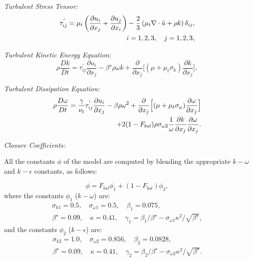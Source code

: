 {\it Turbulent Stress Tensor:}
\begin{equation}
\begin{split}
\tau_{ij}^{'}=\mu_t \left(\frac{\partial u_i}{\partial x_j}+\frac
{\partial u_j}{\partial x_i}\right) - \frac{2}{3} \left(\mu_t \nabla \cdot \Tilde{u} + \rho k\right) \delta_{ij}, \\
 i=1,2,3, \quad j=1,2,3,
\end{split}
\end{equation}


{\it Turbulent Kinetic Energy Equation:}
\begin{equation}
\rho \frac{D k}{Dt} = \tau_{ij}^{'}\frac{\partial u_i}
{\partial x_j}-\beta^{\star}\rho\omega k + \frac{\partial}{\partial
 x_{j}} \bigl[(\mu+\mu_t \sigma_k)
\frac{\partial k}{\partial x_j} \Bigr] ,
\label{kb-turb}
\end{equation}

{\it Turbulent Dissipation Equation:}
\begin{equation}
\begin{split}
\rho \frac{D \omega}{D t} = \frac{\gamma}{\nu_{t}}\tau_{ij}^{'}\frac{\partial u_i}
{\partial x_j} - \beta \rho \omega^{2} +
\frac{\partial}{\partial x_j} \Bigl[ (\mu+\mu_t \sigma_{\omega})
\frac{\partial \omega}{\partial x_j} \Bigr] \\
+2(1-F_{bsl})\rho \sigma_{\omega 2} \frac{1}{\omega} \frac{\partial k}
{\partial x_{j}} \frac{\partial \omega}{\partial x_{j}}.
\end{split}
\label{omega-turb}
\end{equation}

{\it Closure Coefficients:}

All the constants $\phi$ of the model are computed by blending the
appropriate $k-\omega$ and $k-\epsilon$ constants, as follows:

\begin{equation}
\phi = F_{bsl} \phi_{1} + (1-F_{bsl}) \phi_2,
\label{constant}
\end{equation}
where the constants $\phi_1$ ($k-\omega$) are:
\begin{multline}
\sigma_{k1} = 0.5, \quad \sigma_{\omega 1} = 0.5,
\quad \beta_1 = 0.075,\\
 \beta^{\star} = 0.09, \quad \kappa = 0.41,
\quad \gamma_1 = \beta_1/\beta^{\star} - \sigma_{\omega 1} \kappa^{2}/\sqrt
{\beta^{\star}},
\end{multline}
and the constants $\phi_2$ ($k-\epsilon$) are:
\begin{multline}
\sigma_{k2} = 1.0, \quad \sigma_{\omega 2} = 0.856,
\quad \beta_2 = 0.0828,\\
 \beta^{\star} = 0.09, \quad \kappa = 0.41,
\quad \gamma_2 = \beta_2/\beta^{\star} - \sigma_{\omega 2} \kappa^{2}/\sqrt
{\beta^{\star}}.
\end{multline}

